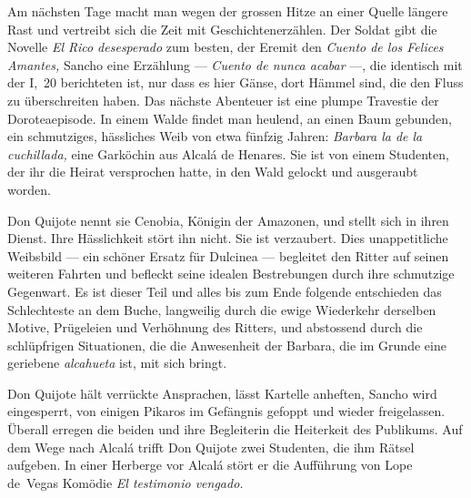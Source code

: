 Am nächsten Tage macht man wegen der grossen Hitze an einer
Quelle längere Rast und vertreibt sich die Zeit mit Geschichtenerzählen.
Der Soldat gibt die Novelle {\it\spanish El Rico desesperado} zum besten, der
Eremit den {\it\spanish Cuento de los Felices Amantes,} Sancho eine Erzählung
--- {\it\spanish Cuento de nunca acabar} ---, die identisch mit
der I,~20 berichteten ist, nur dass es hier Gänse, dort Hämmel sind, die den Fluss zu
überschreiten haben. Das nächste Abenteuer ist eine plumpe Travestie der
Doroteaepisode. In einem Walde findet man heulend, an einen Baum gebunden,
ein schmutziges, hässliches Weib von etwa fünfzig Jahren: {\it\spanish Barbara
la de la cuchillada,} eine Garköchin aus Alcalá de Henares. Sie ist
von einem Studenten, der ihr die Heirat versprochen hatte, in den
Wald gelockt und ausgeraubt worden.

Don Quijote nennt sie Cenobia, Königin der Amazonen, und stellt
sich in ihren Dienst. Ihre Hässlichkeit stört ihn nicht. Sie ist verzaubert.
Dies unappetitliche Weibsbild --- ein schöner Ersatz für Dulcinea ---
begleitet den Ritter auf seinen weiteren Fahrten und befleckt
seine idealen Bestrebungen durch ihre schmutzige Gegenwart. Es ist
dieser Teil und alles bis zum Ende folgende entschieden das Schlechteste
an dem Buche, langweilig durch die ewige Wiederkehr derselben Motive,
Prügeleien und Verhöhnung des Ritters, und abstossend durch die
schlüpfrigen Situationen, die die Anwesenheit der Barbara, die im Grunde
eine geriebene {\it\spanish alcahueta} ist, mit sich bringt.

Don Quijote hält verrückte Ansprachen, lässt Kartelle anheften,
Sancho wird eingesperrt, von einigen Pikaros im Gefängnis gefoppt und
wieder freigelassen. Überall erregen die beiden und ihre Begleiterin die
Heiterkeit des Publikums. Auf dem Wege nach Alcalá trifft Don Quijote
zwei Studenten, die ihm Rätsel aufgeben. In einer Herberge vor Alcalá
stört er die Aufführung von Lope de~Vegas Komödie {\it\spanish El testimonio
vengado.}

